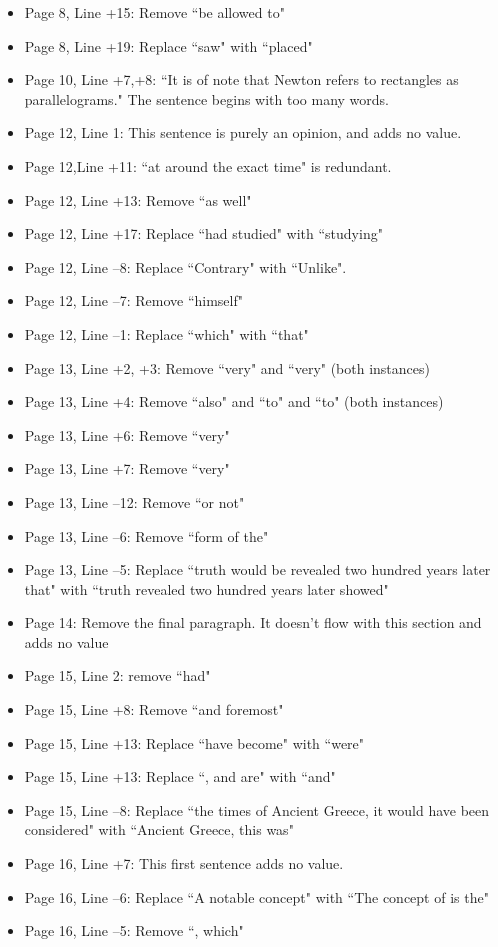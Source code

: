 \documentclass[11pt]{article}
\begin{document}
\begin{itemize}
\begin{itemize}
		\item Page 8, Line +15: Remove ``be allowed to"
		\item Page 8, Line +19: Replace ``saw" with ``placed"
		\item Page 10, Line +7,+8: ``It is of note that Newton refers to rectangles as parallelograms." The sentence begins with too many words.
		\item Page 12, Line 1: This sentence is purely an opinion, and adds no value.
		\item Page 12,Line +11: ``at around the exact time" is redundant.
		\item Page 12, Line +13: Remove ``as well"
		\item Page 12, Line +17: Replace ``had studied" with ``studying"
		\item Page 12, Line --8: Replace ``Contrary" with ``Unlike".
		\item Page 12, Line --7: Remove ``himself"
		\item Page 12, Line --1: Replace ``which" with ``that"
		\item Page 13, Line +2, +3: Remove ``very" and ``very" (both instances)
		\item Page 13, Line +4: Remove ``also" and ``to" and ``to" (both instances)
		\item Page 13, Line +6: Remove ``very"
		\item Page 13, Line +7: Remove ``very"
		\item Page 13, Line --12: Remove ``or not"
		\item Page 13, Line --6: Remove ``form of the"
		\item Page 13, Line --5: Replace ``truth would be revealed two hundred years later that" with ``truth revealed two hundred years later showed"
		\item Page 14: Remove the final paragraph. It doesn't flow with this section and adds no value
		\item Page 15, Line 2: remove ``had"
		\item Page 15, Line +8: Remove ``and foremost"
		\item Page 15, Line +13: Replace ``have become" with ``were"
		\item Page 15, Line +13: Replace ``, and are" with ``and"
		\item Page 15, Line --8: Replace ``the times of Ancient Greece, it would have been considered" with ``Ancient Greece, this was"
		\item Page 16, Line +7: This first sentence adds no value. 
		\item Page 16, Line --6: Replace ``A notable concept" with ``The concept of is the"
		\item Page 16, Line --5: Remove ``, which"
	\end{itemize}
	

\end{itemize}
\end{document}
